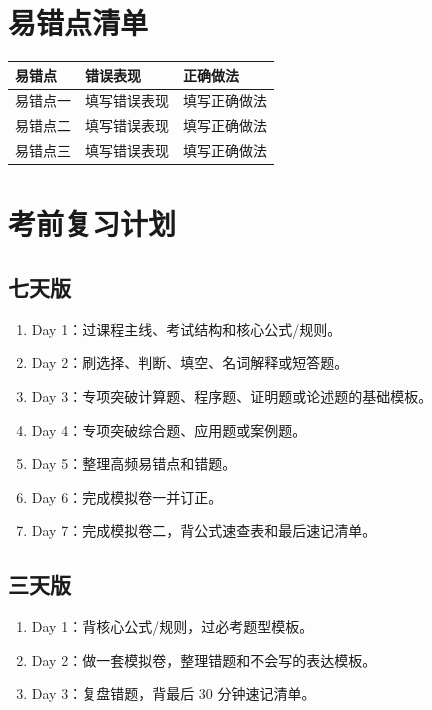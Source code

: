 \documentclass[UTF8,zihao=-4]{ctexart}
\begin{document}
\section{易错点清单}

\begin{longtable}{p{}p{}p{}}
\toprule
\textbf{易错点} & \textbf{错误表现} & \textbf{正确做法} \\
\midrule
易错点一 & 填写错误表现 & 填写正确做法 \\
易错点二 & 填写错误表现 & 填写正确做法 \\
易错点三 & 填写错误表现 & 填写正确做法 \\
\bottomrule
\end{longtable}

\section{考前复习计划}

\subsection{七天版}
\begin{methodbox}[7 天复习安排]
\begin{enumerate}
  \item Day 1：过课程主线、考试结构和核心公式/规则。
  \item Day 2：刷选择、判断、填空、名词解释或短答题。
  \item Day 3：专项突破计算题、程序题、证明题或论述题的基础模板。
  \item Day 4：专项突破综合题、应用题或案例题。
  \item Day 5：整理高频易错点和错题。
  \item Day 6：完成模拟卷一并订正。
  \item Day 7：完成模拟卷二，背公式速查表和最后速记清单。
\end{enumerate}
\end{methodbox}

\subsection{三天版}
\begin{methodbox}[3 天冲刺安排]
\begin{enumerate}
  \item Day 1：背核心公式/规则，过必考题型模板。
  \item Day 2：做一套模拟卷，整理错题和不会写的表达模板。
  \item Day 3：复盘错题，背最后 30 分钟速记清单。
\end{enumerate}
\end{methodbox}
\end{document}
